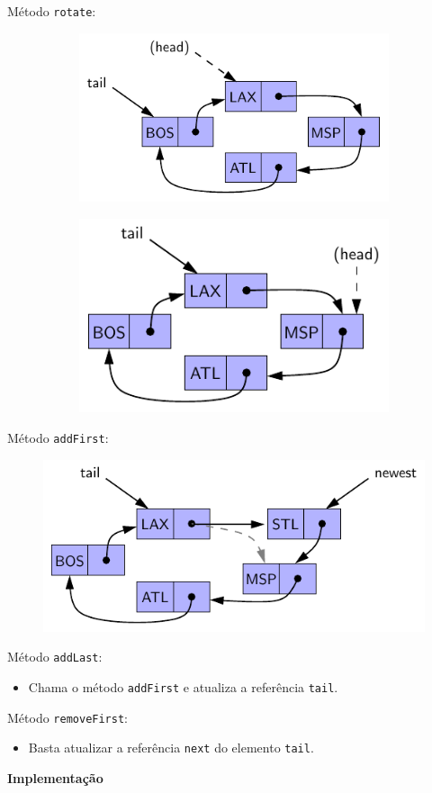 \clearpage

Método \texttt{rotate}:
\begin{figure}[H]
	\centering
	\begin{subfigure}
		\centering
		\includegraphics[width=.35\linewidth]{img/figure-3-17a}
	\end{subfigure}%
	\hspace{10pt}
	\begin{subfigure}
		\centering
		\includegraphics[width=.29\linewidth]{img/figure-3-17b}
	\end{subfigure}
\end{figure}

Método \texttt{addFirst}:
\begin{figure}[H]
	\centering
	\includegraphics[width=0.5\linewidth]{img/figure-3-18}
\end{figure}

Método \texttt{addLast}:
\begin{itemize}
	\item Chama o método \texttt{addFirst} e atualiza a referência \texttt{tail}.
\end{itemize}
	
Método \texttt{removeFirst}:
\begin{itemize}
	\item Basta atualizar a referência \texttt{next} do elemento \texttt{tail}.
\end{itemize}

\clearpage

\textbf{Implementação}

\medskip

